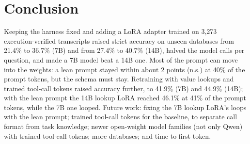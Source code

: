 \section{Conclusion}
Keeping the harness fixed and adding a LoRA adapter trained on 3,273 execution-verified transcripts raised strict accuracy on unseen databases from 21.4\% to 36.7\% (7B) and from 27.4\% to 40.7\% (14B), halved the model calls per question, and made a 7B model beat a 14B one. Most of the prompt can move into the weights: a lean prompt stayed within about 2 points (n.s.) at 40\% of the prompt tokens, but the schema must stay. Retraining with value lookups and trained tool-call tokens raised accuracy further, to 41.9\% (7B) and 44.9\% (14B); with the lean prompt the 14B lookup LoRA reached 46.1\% at 41\% of the prompt tokens, while the 7B one looped. Future work: fixing the 7B lookup LoRA's loops with the lean prompt; trained tool-call tokens for the baseline, to separate call format from task knowledge; newer open-weight model families (not only Qwen) with trained tool-call tokens; more databases; and time to first token.

{\footnotesize
\let\oldthebibliography\thebibliography
\renewcommand\thebibliography[1]{\oldthebibliography{#1}\setlength{\itemsep}{0.1ex}}


}
